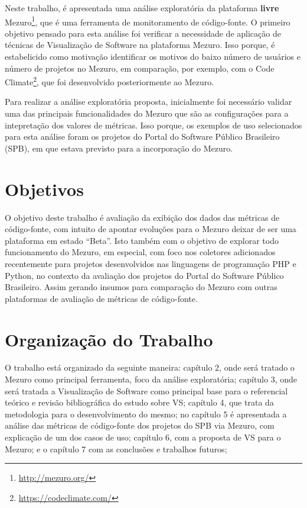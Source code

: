 Neste trabalho, é apresentada uma análise exploratória da plataforma \textbf{livre}
Mezuro\footnote{\url{http://mezuro.org/}}, que é uma ferramenta de monitoramento
de código-fonte. O primeiro objetivo pensado para esta análise foi verificar a
necessidade de aplicação de técnicas de Visualização de Software na plataforma
Mezuro. Isso porque, é estabelicido como motivação identificar os motivos do
baixo número de usuários e número de projetos no Mezuro, em comparação, por
exemplo, com o Code Climate\footnote{\url{https://codeclimate.com/}}, que foi
desenvolvido posteriormente ao Mezuro.

Para realizar a análise exploratória proposta, inicialmente foi necessário
validar uma das principais funcionalidades do Mezuro que são as configurações
para a intepretação dos valores de métricas. Isso porque, os exemplos de uso
selecionados para esta análise foram os projetos do Portal do Software
Público Brasileiro (SPB), em que estava previsto para a incorporação do Mezuro.

\section{Objetivos}

O objetivo deste trabalho é avaliação da exibição dos dados das métricas de
código-fonte, com intuito de apontar evoluções para o Mezuro deixar de ser uma
plataforma em estado ``Beta''.
%
Isto também com o objetivo de explorar todo funcionamento do Mezuro, em especial,
com foco nos coletores adicionados recentemente para projetos desenvolvidos nas
linguagens de programação PHP e Python, no contexto da avaliação dos projetos do
Portal do Software Público Brasileiro.
%
Assim gerando insumos para comparação do Mezuro com outras plataformas de
avaliação de métricas de código-fonte.

\section{Organização do Trabalho}


O trabalho está organizado da seguinte maneira: capítulo 2, onde será tratado o
Mezuro como principal ferramenta, foco da análise exploratória; capítulo 3, onde
será tratada a Visualização de Software como principal base para o
referencial teórico e revisão bibliográfica do estudo sobre VS; capítulo 4,
que trata da metodologia para o desenvolvimento do mesmo; no capítulo 5 é
apresentada a análise das métricas de código-fonte dos projetos do SPB via
Mezuro, com explicação de um dos casos de uso; capítulo 6, com a proposta de VS
para o Mezuro; e o capítulo 7 com as conclusões e trabalhos futuros;
